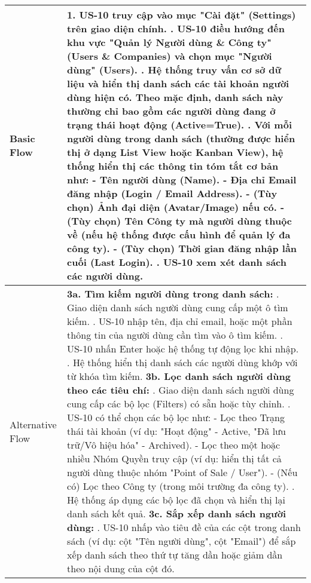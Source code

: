 \begin{longtable}{|m{4cm}|p{11cm}|}
Basic Flow & 1. US-10 truy cập vào mục "Cài đặt" (Settings) trên giao diện chính. \newline 2. US-10 điều hướng đến khu vực "Quản lý Người dùng \& Công ty" (Users \& Companies) và chọn mục "Người dùng" (Users). \newline 3. Hệ thống truy vấn cơ sở dữ liệu và hiển thị danh sách các tài khoản người dùng hiện có. Theo mặc định, danh sách này thường chỉ bao gồm các người dùng đang ở trạng thái hoạt động (Active=True). \newline 4. Với mỗi người dùng trong danh sách (thường được hiển thị ở dạng List View hoặc Kanban View), hệ thống hiển thị các thông tin tóm tắt cơ bản như: \newline    - Tên người dùng (Name). \newline    - Địa chỉ Email đăng nhập (Login / Email Address). \newline    - (Tùy chọn) Ảnh đại diện (Avatar/Image) nếu có. \newline    - (Tùy chọn) Tên Công ty mà người dùng thuộc về (nếu hệ thống được cấu hình để quản lý đa công ty). \newline    - (Tùy chọn) Thời gian đăng nhập lần cuối (Last Login). \newline 5. US-10 xem xét danh sách các người dùng. \\
\hline
Alternative Flow & \textbf{3a. Tìm kiếm người dùng trong danh sách:} \newline    1. Giao diện danh sách người dùng cung cấp một ô tìm kiếm. \newline    2. US-10 nhập tên, địa chỉ email, hoặc một phần thông tin của người dùng cần tìm vào ô tìm kiếm. \newline    3. US-10 nhấn Enter hoặc hệ thống tự động lọc khi nhập. \newline    4. Hệ thống hiển thị danh sách các người dùng khớp với từ khóa tìm kiếm. \newline \textbf{3b. Lọc danh sách người dùng theo các tiêu chí:} \newline    1. Giao diện danh sách người dùng cung cấp các bộ lọc (Filters) có sẵn hoặc tùy chỉnh. \newline    2. US-10 có thể chọn các bộ lọc như: \newline       - Lọc theo Trạng thái tài khoản (ví dụ: "Hoạt động" - Active, "Đã lưu trữ/Vô hiệu hóa" - Archived). \newline       - Lọc theo một hoặc nhiều Nhóm Quyền truy cập (ví dụ: hiển thị tất cả người dùng thuộc nhóm "Point of Sale / User"). \newline       - (Nếu có) Lọc theo Công ty (trong môi trường đa công ty). \newline    3. Hệ thống áp dụng các bộ lọc đã chọn và hiển thị lại danh sách kết quả. \newline \textbf{3c. Sắp xếp danh sách người dùng:} \newline    1. US-10 nhấp vào tiêu đề của các cột trong danh sách (ví dụ: cột "Tên người dùng", cột "Email") để sắp xếp danh sách theo thứ tự tăng dần hoặc giảm dần theo nội dung của cột đó. \\

\end{longtable}
